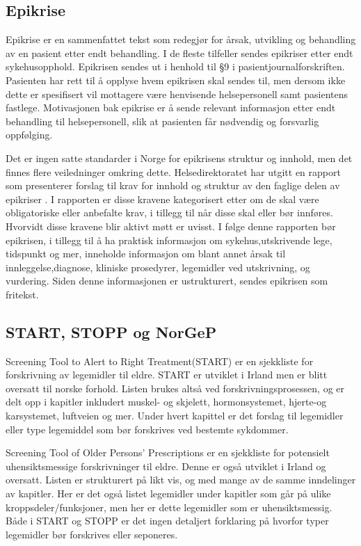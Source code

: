 \subsection{Epikrise}
Epikrise er en sammenfattet tekst som redegjør for årsak, utvikling og behandling av en pasient etter endt behandling. I de fleste tilfeller sendes epikriser etter endt sykehusopphold. Epikrisen sendes ut i henhold til §9 i pasientjournalforskriften. Pasienten har rett til å opplyse hvem epikrisen skal sendes til, men dersom ikke dette er spesifisert vil mottagere være henvisende helsepersonell samt pasientens fastlege. Motivasjonen bak epikrise er å sende relevant informasjon etter endt behandling til helsepersonell, slik at pasienten får nødvendig og forsvarlig oppfølging.

Det er ingen satte standarder i Norge for epikrisens struktur og innhold, men det finnes flere veiledninger omkring dette. Helsedirektoratet har utgitt en rapport som presenterer forslag til krav for innhold og struktur av den faglige delen av epikriser \citep{Den_gode_epikrise}. I rapporten er disse kravene kategorisert etter om de skal være obligatoriske eller anbefalte krav, i tillegg til når disse skal eller bør innføres. Hvorvidt disse kravene blir aktivt møtt er uvisst. I følge denne rapporten bør epikrisen, i tillegg til å ha praktisk informasjon om sykehus,utskrivende lege, tidspunkt og mer, inneholde informasjon om blant annet årsak til innleggelse,diagnose, kliniske prosedyrer, legemidler ved utskrivning, og vurdering. Siden denne informasjonen er ustrukturert, sendes epikrisen som fritekst.

\subsection{START, STOPP og NorGeP}
Screening Tool to Alert to Right Treatment(START) er en sjekkliste for forskrivning av legemidler til eldre. START er utviklet i Irland men er blitt oversatt til norske forhold. Listen brukes altså ved forskrivningsprosessen, og er delt opp i kapitler inkludert muskel- og skjelett, hormonsystemet, hjerte-og karsystemet, luftveien og mer. Under hvert kapittel er det forslag til legemidler eller type legemiddel som bør forskrives ved bestemte sykdommer.

Screening Tool of Older Persons’ Prescriptions er en sjekkliste for potensielt uhensiktsmessige forskrivninger til eldre. Denne er også utviklet i Irland og oversatt. Listen er strukturert på likt vis, og med mange av de samme inndelinger av kapitler. Her er det også listet legemidler under kapitler som går på ulike kroppsdeler/funksjoner, men her er dette legemidler som er uhensiktsmessig. Både i START og STOPP er det ingen detaljert forklaring på hvorfor typer legemidler bør forskrives eller seponeres.

